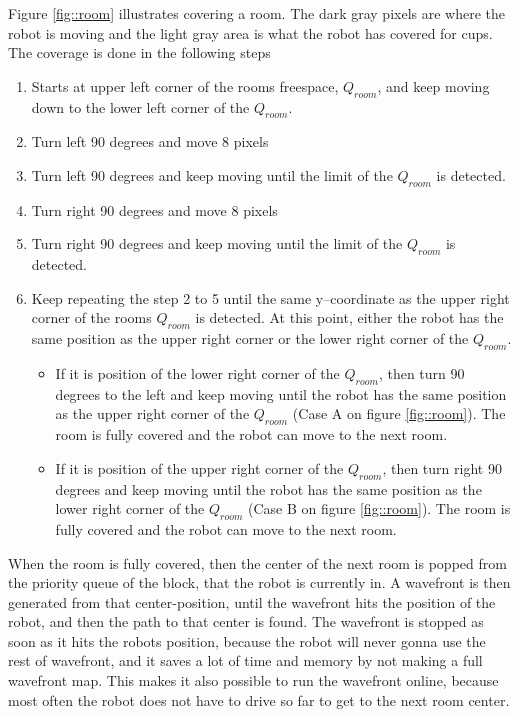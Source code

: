 Figure \ref{fig::room} illustrates covering a room. The dark gray pixels are where the robot is moving and the light gray area is what the robot has covered for cups. The coverage is done in the following steps
\begin{enumerate}\itemsep-2pt
\item Starts at upper left corner of the rooms freespace, $Q_{room}$, and keep moving down to the lower left corner of the $Q_{room}$.
\item Turn left 90 degrees and move 8 pixels
\item Turn left 90 degrees and keep moving until the limit of the $Q_{room}$ is detected.
\item Turn right 90 degrees and move 8 pixels
\item Turn right 90 degrees and keep moving until the limit of the $Q_{room}$ is detected.
\item Keep repeating the step 2 to 5 until the same y--coordinate as the upper right corner of the rooms $Q_{room}$ is detected. At this point, either the robot has the same position as the upper right corner or the lower right corner of the $Q_{room}$.    
\begin{itemize}\itemsep-2pt  
\item If it is position of the lower right corner of the $Q_{room}$, then turn 90 degrees to the left and keep moving until the robot has the same position as the upper right corner of the $Q_{room}$ (Case A on figure \ref{fig::room}). The room is fully covered and the robot can move to the next room. 
\item If it is position of the upper right corner of the $Q_{room}$, then turn right 90 degrees and keep moving until the robot has the same position as the lower right corner of the $Q_{room}$ (Case B on figure \ref{fig::room}). The room is fully covered and the robot can move to the next room. 
\end{itemize}
\end{enumerate} 
When the room is fully covered, then the center of the next room is popped from the priority queue of the block, that the robot is currently in. A wavefront is then generated from that center-position, until the wavefront hits the position of the robot, and then the path to that center is found. The wavefront is stopped as soon as it hits the robots position, because the robot will never gonna use the rest of wavefront, and it saves a lot of time and memory by not making a full wavefront map. This makes it also possible to run the wavefront online, because most often the robot does not have to drive so far to get to the next room center. 

